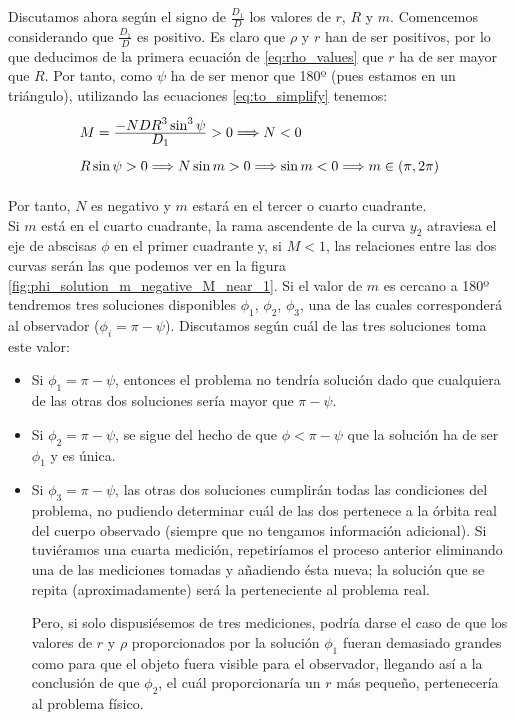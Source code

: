 \documentclass[11pt]{book}
\newcommand\ddfrac[2]{\frac{\displaystyle #1}{\displaystyle #2}}
\begin{document}
Discutamos ahora según el signo de $\frac{D_1}{D}$ los valores de $r$, $R$ y $m$. Comencemos considerando que $\frac{D_1}{D}$ es positivo. Es claro que $\rho$ y $r$ han de ser positivos, por lo que deducimos de la primera ecuación de \eqref{eq:rho_values} que $r$ ha de ser mayor que $R$. Por tanto, como $\psi$ ha de ser menor que 180º (pues estamos en un triángulo), utilizando las ecuaciones \eqref{eq:to_simplify} tenemos:
\[
\def\arraystretch{2}
\begin{array}{l}
M=\ddfrac{-NDR^3\sin^3{\psi}}{D_1}>0 \Longrightarrow N<0 \\
R\sin{\psi}>0 \Longrightarrow N\sin{m}>0 \Longrightarrow \sin{m}<0 \Longrightarrow m\in(\pi,2\pi)
\end{array}
\]

Por tanto, $N$ es negativo y $m$ estará en el tercer o cuarto cuadrante.\\

Si $m$ está en el cuarto cuadrante, la rama ascendente de la curva $y_2$ atraviesa el eje de abscisas $\phi$ en el primer cuadrante y, si $M<1$, las relaciones entre las dos curvas serán las que podemos ver en la figura \ref{fig:phi_solution_m_negative_M_near_1}. Si el valor de $m$ es cercano a 180º tendremos tres soluciones disponibles $\phi_1$, $\phi_2$, $\phi_3$, una de las cuales corresponderá al observador ($\phi_i=\pi-\psi$). Discutamos según cuál de las tres soluciones toma este valor:
\begin{itemize}
\item Si $\phi_1=\pi-\psi$, entonces el problema no tendría solución dado que cualquiera de las otras dos soluciones sería mayor que $\pi-\psi$.
\item Si $\phi_2=\pi-\psi$, se sigue del hecho de que $\phi<\pi-\psi$ que la solución ha de ser $\phi_1$ y es única.
\item Si $\phi_3=\pi-\psi$, las otras dos soluciones cumplirán todas las condiciones del problema, no pudiendo determinar cuál de las dos pertenece a la órbita real del cuerpo observado (siempre que no tengamos información adicional). Si tuviéramos una cuarta medición, repetiríamos el proceso anterior eliminando una de las mediciones tomadas y añadiendo ésta nueva; la solución que se repita (aproximadamente) será la perteneciente al problema real.

Pero, si solo dispusiésemos de tres mediciones, podría darse el caso de que los valores de $r$ y $\rho$ proporcionados por la solución $\phi_1$ fueran demasiado grandes como para que el objeto fuera visible para el observador, llegando así a la conclusión de que $\phi_2$, el cuál proporcionaría un $r$ más pequeño, pertenecería al problema físico.
\end{itemize} 
\end{document}
